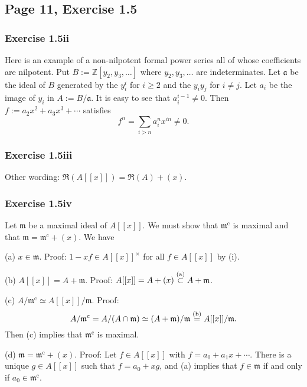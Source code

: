 \documentclass[parskip=half,fontsize=12pt]{scrartcl}%
\newcommand{\oo}{\operatorname}\newcommand{\ooo}{\operatorname*}
\newcommand{\mf}{\mathfrak}
\newcommand{\aaa}{\mf a}
\newcommand{\mmm}{\mf m}
\begin{document}
\subsection{Page 11, Exercise 1.5}%

\subsubsection{Exercise 1.5ii}

Here is an example of a non-nilpotent formal power series all of whose coefficients are nilpotent. Put $B:=\mathbb Z[y_2,y_3,\dots]$ where $y_2,y_3,\dots$ are indeterminates. Let $\aaa$ be the ideal of $B$ generated by the $y_i^i$ for $i\ge2$ and the $y_iy_j$ for $i\neq j$. Let $a_i$ be the image of $y_i$ in $A:=B/\aaa$. It is easy to see that $a_i^{i-1}\neq0$. Then $f:=a_2x^2+a_3x^3+\cdots$ satisfies 
$$
f^n=\sum_{i>n}a_i^nx^{in}\neq0.
$$

\subsubsection{Exercise 1.5iii}%

Other wording: $\mf R(A[[x]])=\mf R(A)+(x)$.

\subsubsection{Exercise 1.5iv}%

Let $\mmm$ be a maximal ideal of $A[[x]]$. We must show that $\mmm^{\oo c}$ is maximal and that $\mmm=\mmm^{\oo c}+(x)$. We have 

(a) $x\in\mmm$. Proof: $1-xf\in A[[x]]^\times$ for all $f\in A[[x]]$ by (i).

(b) $A[[x]]=A+\mmm$. Proof: $A[[x]]=A+(x)\overset{(\text a)}\subset A+\mmm$.

(c) $A/\mmm^{\oo c}\simeq A[[x]]/\mmm$. Proof: 
$$
A/\mmm^{\oo c}=A/(A\cap\mmm)\simeq(A+\mmm)/\mmm\overset{(\text b)}=A[[x]]/\mmm.
$$ 
Then (c) implies that $\mmm^{\oo c}$ is maximal.

(d) $\mmm=\mmm^{\oo c}+(x)$. Proof: Let $f\in A[[x]]$ with $f=a_0+a_1x+\cdots$. There is a unique $g\in A[[x]]$ such that $f=a_0+xg$, and (a) implies that $f\in\mmm$ if and only if $a_0\in\mmm^{\oo c}$. %
\end{document}
